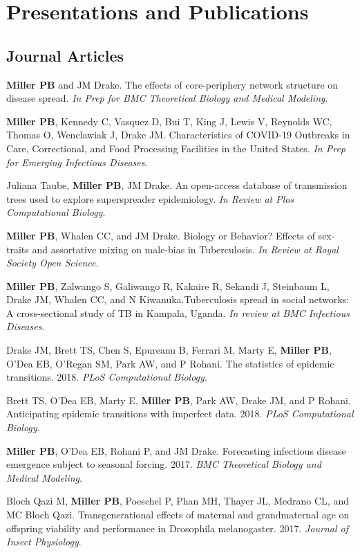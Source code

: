 \documentclass[letterpaper]{article}
\renewenvironment{itemize}{
  \begin{list}{}{
    \setlength{\leftmargin}{1.5em}
  }
}{
  \end{list}
}
\begin{document}
\section*{Presentations and Publications}

\subsection*{Journal Articles}

\begin{itemize}
\item    \textbf{Miller PB} and JM Drake. The effects of core-periphery network structure on disease spread. \textit{In Prep for BMC Theoretical Biology and Medical Modeling}. 
\item    \textbf{Miller PB}, Kennedy C, Vasquez D, Bui T, King J, Lewis V, Reynolds WC, Thomas O,  Wenclawiak J, Drake JM. Characteristics of COVID-19 Outbreaks in Care, Correctional, and Food Processing Facilities in the United States. \textit{In Prep for Emerging Infectious Diseases}. 
\item  Juliana Taube, \textbf{Miller PB}, JM Drake. An open-access database of transmission trees used to explore superspreader epidemiology. \textit{In Review at Plos Computational Biology}. 
\item    \textbf{Miller PB},  Whalen CC, and JM Drake. Biology or Behavior? Effects of sex-traits and assortative mixing on male-bias in Tuberculosis. \textit{In Review at Royal Society Open Science}. 
\item   \textbf{Miller PB}, Zalwango S, Galiwango R, Kakaire R, Sekandi J, Steinbaum L, Drake JM, Whalen CC, and N Kiwanuka.Tuberculosis spread in social networks: A cross-sectional study of TB in Kampala, Uganda. \textit{In review at BMC Infectious Diseases}. 
\item Drake JM, Brett TS,  Chen S, Epureanu B, Ferrari M, Marty E, \textbf{Miller PB}, O'Dea EB, O'Regan SM, Park AW, and P Rohani. The statistics of epidemic transitions. 2018. \textit{PLoS Computational Biology}. 
\item Brett TS,  O'Dea EB, Marty E, \textbf{Miller PB}, Park AW, Drake JM, and P Rohani. Anticipating epidemic transitions with imperfect data. 2018. \textit{PLoS Computational Biology}. 
\item \textbf{Miller PB}, O'Dea EB, Rohani P, and JM Drake. Forecasting infectious disease emergence subject to seasonal forcing. 2017. \textit{BMC Theoretical Biology and Medical Modeling}.
\item Bloch Qazi M, \textbf{Miller PB}, Poeschel P, Phan MH, Thayer JL, Medrano CL, and MC Bloch Qazi. Transgenerational effects of maternal and grandmaternal age on offspring viability and performance in Drosophila melanogaster. 2017. \textit{Journal of Insect Physiology}.

\end{itemize}
\end{document}
